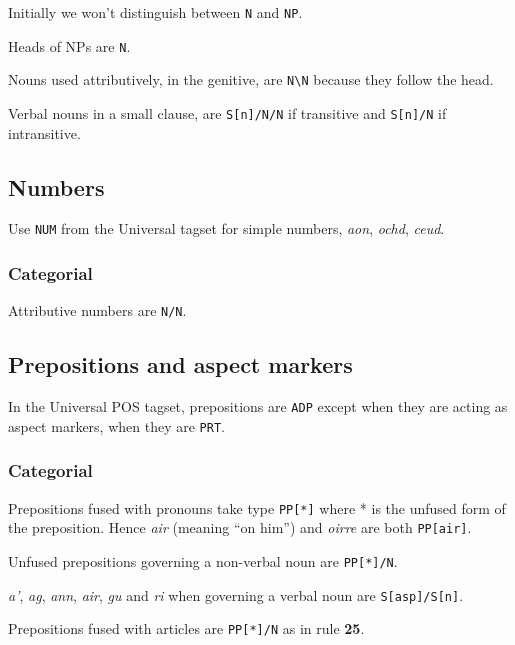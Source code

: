 \documentclass[a4paper]{article}
\begin{document}
Initially we won't distinguish between \texttt{N} and \texttt{NP}.

 Heads of NPs are \texttt{N}.

 Nouns used attributively, in the genitive, are \texttt{N\textbackslash N} because they follow the head.

 Verbal nouns in a small clause, are \texttt{S[n]/N/N} if transitive and \texttt{S[n]/N} if intransitive.

\subsection{Numbers\label{subsect:numbers}}

Use \texttt{NUM} from the Universal tagset for simple numbers, \textit{aon}, \textit{ochd}, \textit{ceud}.

\subsubsection*{Categorial}

 Attributive numbers are \texttt{N/N}.

\subsection{Prepositions and aspect markers\label{subsect:prepositions}}

In the Universal POS tagset, prepositions are \texttt{ADP} except when they are acting as aspect markers, when they are \texttt{PRT}.



\subsubsection*{Categorial}
 Prepositions fused with pronouns take type \texttt{PP[*]} where * is the unfused form of the preposition.
Hence \textit{air} (meaning ``on him'') and \textit{oirre} are both \texttt{PP[air]}.

 Unfused prepositions governing a non-verbal noun are \texttt{PP[*]/N}.

 \textit{a'}, \textit{ag}, \textit{ann}, \textit{air}, \textit{gu} and \textit{ri} when governing a verbal noun are \texttt{S[asp]/S[n]}.

 Prepositions fused with articles are \texttt{PP[*]/N} as in rule {\bf 25}.
\end{document}

